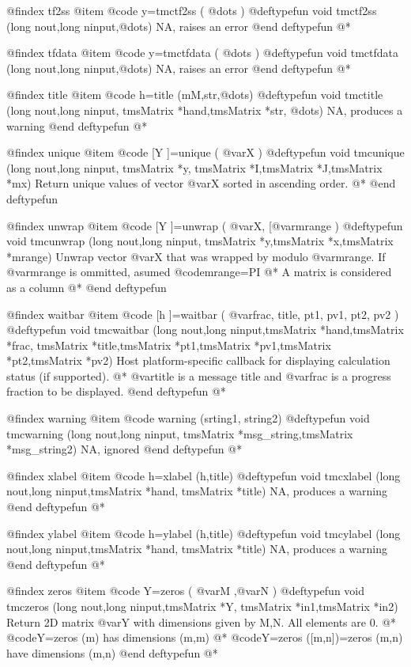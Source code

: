  
@findex tf2ss
@item @code{ y=tmctf2ss  (   @dots{} )}
@deftypefun void tmctf2ss  (long nout,long ninput,@dots{})
NA, raises  an error
@end deftypefun
@*

@findex tfdata
@item @code{ y=tmctfdata  (   @dots{} )}
@deftypefun void tmctfdata  (long nout,long ninput,@dots{})
NA, raises  an error
@end deftypefun
@*



@findex  title
@item @code{ h=title (mM,str,@dots{}) }
@deftypefun void tmctitle  (long nout,long ninput, tmsMatrix *hand,tmsMatrix *str, @dots{})
NA, produces a warning
@end deftypefun
@*



@findex  unique
@item @code{  [Y ]=unique  ( @var{X} )}
@deftypefun void tmcunique  (long nout,long ninput, tmsMatrix *y, tmsMatrix *I,tmsMatrix *J,tmsMatrix *mx)
Return unique values of vector @var{X} sorted in ascending order. @*
@end deftypefun


@findex  unwrap
@item @code{  [Y ]=unwrap  ( @var{X}, [@var{mrange} )}
@deftypefun void tmcunwrap (long nout,long ninput, tmsMatrix *y,tmsMatrix *x,tmsMatrix *mrange)
Unwrap vector @var{X} that was wrapped by modulo @var{mrange}. If @var{mrange}
is ommitted, asumed @code{mrange=PI} @*
A matrix is considered as a column @*
@end deftypefun


@findex waitbar
@item @code{  [h ]=waitbar  ( @var{frac}, title, pt1, pv1, pt2, pv2 )}
@deftypefun void tmcwaitbar  (long nout,long ninput,tmsMatrix *hand,tmsMatrix *frac, tmsMatrix *title,tmsMatrix *pt1,tmsMatrix *pv1,tmsMatrix *pt2,tmsMatrix *pv2)
Host platform-specific callback for displaying calculation status  (if supported). @*
@var{title} is a message title and @var{frac} is a progress fraction to be displayed.
@end deftypefun
@*


@findex warning
@item @code{ warning (srting1, string2) }
@deftypefun void tmcwarning  (long nout,long ninput, tmsMatrix *msg_string,tmsMatrix *msg_string2)
NA, ignored
@end deftypefun
@*


@findex xlabel
@item @code{ h=xlabel (h,title) }
@deftypefun void tmcxlabel (long nout,long ninput,tmsMatrix *hand, tmsMatrix *title)
NA, produces a warning
@end deftypefun
@*



@findex ylabel
@item @code{ h=ylabel (h,title) }
@deftypefun void tmcylabel (long nout,long ninput,tmsMatrix *hand, tmsMatrix *title)
NA, produces a warning
@end deftypefun
@*


@findex zeros 
@item @code{  Y=zeros  (  @var{M}  ,@var{N}  )}
@deftypefun void tmczeros  (long nout,long ninput,tmsMatrix *Y, tmsMatrix *in1,tmsMatrix *in2)
Return 2D   matrix @var{Y} with dimensions given by M,N. All elements are 0. @*
@code{Y=zeros (m)} has  dimensions  (m,m) @*
@code{Y=zeros ([m,n])=zeros (m,n)} have dimensions  (m,n)
@end deftypefun
@*



